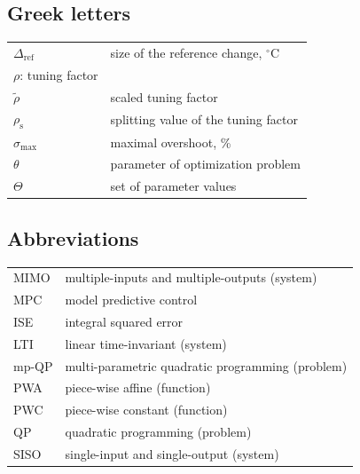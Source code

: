 \documentclass[preprint,12pt]{elsarticle}
\begin{document}
\subsection{Greek letters}
\begin{center}
	\begin{tabular}{ l l }
		$\Delta_\mathrm{ref}$ & size of the reference change, $^{\circ}\mathrm{C}$ \\
		$\rho$:	tuning factor \\
		$\widetilde{\rho}$ & scaled tuning factor \\
		$\rho_{\mathrm{s}}$ & splitting value of the tuning factor \\
		$\sigma_{\max}$ & maximal overshoot, \% \\
		$\theta$ & parameter of optimization problem \\
		$\Theta$ & set of parameter values
	\end{tabular}
\end{center}

\subsection*{Abbreviations}
\begin{center}
	\begin{tabular}{ l l }
		MIMO & multiple-inputs and multiple-outputs (system) \\
		MPC  & model predictive control \\
		ISE  & integral squared error \\
		LTI  & linear time-invariant (system) \\
		mp-QP& multi-parametric quadratic programming (problem) \\
		PWA  & piece-wise affine (function) \\
		PWC  & piece-wise constant (function) \\
		QP   & quadratic programming (problem) \\
		SISO & single-input and single-output (system) \\
	\end{tabular}
\end{center}




 



%
%
%
\end{document}
